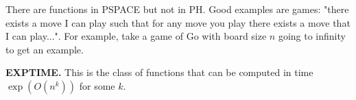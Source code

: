 \documentclass{article}
\theoremstyle{definition}
\begin{document}
There are functions in PSPACE but not in PH. Good examples are games: "there exists a move I can play such that for any move you play there exists a move that I can play...". For example, take a game of Go with board size $n$ going to infinity to get an example.
\vspace{1mm}
 
\textbf{EXPTIME.} This is the class of functions that can be computed in time $\exp(O(n^k))$ for some $k$.
\end{document}
